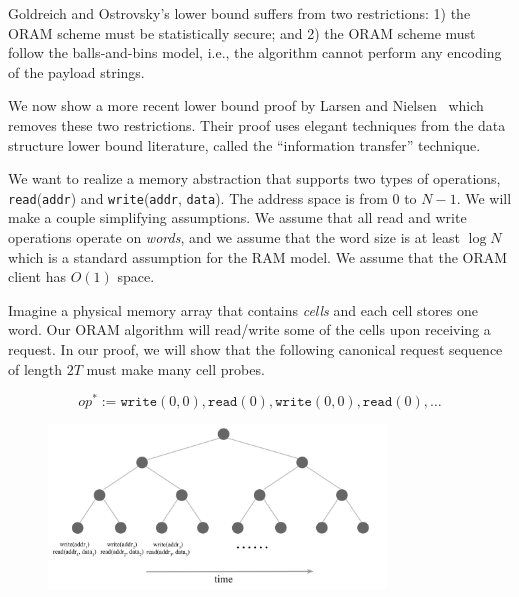 Goldreich and Ostrovsky's lower bound suffers from two restrictions:
1) the ORAM scheme must be statistically secure; and 2) 
the ORAM scheme must follow the balls-and-bins model, i.e.,
the algorithm cannot perform any encoding of the payload strings.

We now 
show a more recent lower bound proof 
by Larsen  
and Nielsen~\cite{larsen18lowerbound} which removes these two restrictions.
Their proof uses elegant 
techniques from the data structure lower bound literature,
called the ``information transfer'' technique.



We want to realize a memory abstraction
that supports two types of operations, 
\texttt{read}(\texttt{addr}) and \texttt{write}(\texttt{addr}, \texttt{data}).
The address space is from $0$ to $N-1$.
We will make a couple simplifying assumptions. 
We assume that all read and write operations
operate on {\it words}, and we assume 
that the word size is at least $\log N$ which is a standard
assumption for the RAM model.
We assume that the ORAM client has $O(1)$ space. 

Imagine a physical memory array that contains {\it cells}
and each cell stores one word. 
Our ORAM algorithm 
will read/write  
some of the cells upon receiving a request.
In our proof, we will show that the following canonical 
request sequence of length $2T$ 
must make many cell probes.

\[op^* := \texttt{write}(0, {0}), \texttt{read}(0), 
\texttt{write}(0, {0}), \texttt{read}(0), \ldots\]

\begin{figure}[t]
\centering
\includegraphics[width=0.8\textwidth]{lntree}
\end{figure}


